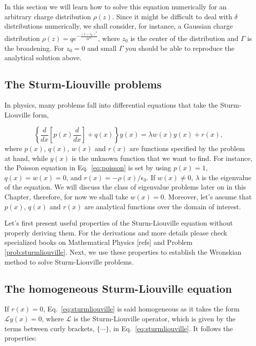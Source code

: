In this section we will learn how to solve this equation numerically for an arbitrary charge distribution $\rho(z)$. Since it might be difficult to deal with $\delta$ distributions numerically, we shall consider, for instance, a Gaussian charge distribution $\rho(z) = q e^{-\frac{(z-z_0)^2}{2\Gamma^2}}$, where $z_0$ is the center of the distribution and $\Gamma$ is the broadening. For $z_0 = 0$ and small $\Gamma$ you should be able to reproduce the analytical solution above.


\subsection{The Sturm-Liouville problems}

In physics, many problems fall into differential equations that take the Sturm-Liouville form,

\begin{equation}
 \left\{\dfrac{d}{dx}\left[p(x) \dfrac{d}{dx}\right] + q(x)\right\}y(x) = \lambda w(x)y(x) + r(x),
 \label{eq:sturmliouville}
\end{equation}
where $p(x)$, $q(x)$, $w(x)$ and $r(x)$ are functions specified by the problem at hand, while $y(x)$ is the unknown function that we want to find. For instance, the Poisson equation in Eq.~\eqref{eq:poisson} is set by using $p(x) = 1$, $q(x) = w(x) = 0$, and $r(x) = -\rho(x)/\epsilon_0$. If $w(x) \neq 0$, $\lambda$ is the eigenvalue of the equation. We will discuss the class of eigenvalue problems later on in this Chapter, therefore, for now we shall take $w(x) = 0$. Moreover, let's assume that $p(x)$, $q(x)$ and $r(x)$ are analytical functions over the domain of interest.

Let's first present useful properties of the Sturm-Liouville equation without properly deriving them. For the derivations and more details please check specialized books on Mathematical Physics [refs] and Problem \ref{prob:sturmliouville}. Next, we use these properties to establish the Wronskian method to solve Sturm-Liouville problems.

\subsection*{The homogeneous Sturm-Liouville equation}

If $r(x) = 0$, Eq.~\eqref{eq:sturmliouville} is said homogeneous as it takes the form $\mathcal{L}y(x) = 0$, where $\mathcal{L}$ is the Sturm-Liouville operator, which is given by the terms between curly brackets, $\{\cdots\}$, in Eq.~\eqref{eq:sturmliouville}. It follows the properties:


